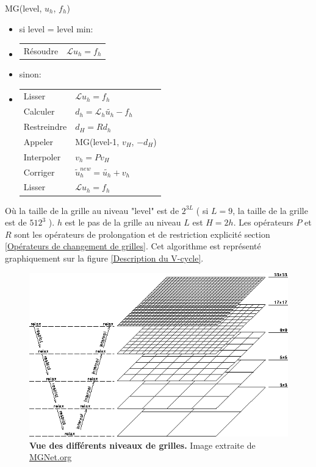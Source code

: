 MG(level, $u_h$, $f_h$)
\begin{itemize}	
\item 	si level = level min:
\item[]	\begin{tabular}{ll}
		Résoudre & $\mathcal{L} u_h = f_h $
		\end{tabular}
\item 	sinon:
\item[]	\begin{tabular}{ll}
		Lisser 		& 	$ \mathcal{L} u_h = f_h $\\
		Calculer	&	$ d_h = \mathcal{L}_h \tilde{u_h} - f_h $\\
		Restreindre	&	$ d_H = Rd_h$\\
		Appeler 	&	MG(level-1, $v_H$, $-d_H$) \\
		Interpoler	&	$ v_h = Pv_H$\\
		Corriger	&	$ \tilde{u}_h^{new} = \tilde{u_h} + v_h$\\
		Lisser		&	$ \mathcal{L} u_h = f_h $
		\end{tabular} 
\end{itemize}

Où la taille de la grille au niveau "level" est de $2^{3L}$ ( si $L=9$, la taille de la grille est de $512^3$ ). $h$ est le pas de la grille au niveau $L$ est $H = 2h$. 
Les opérateurs $P$ et $R$ sont les opérateurs de prolongation et de restriction explicité section \ref{Opérateurs de changement de grilles}.
Cet algorithme est représenté graphiquement sur la figure \ref{Description du V-cycle}.

\begin{figure}[htbp]
\begin{center}
\includegraphics[scale=0.35]{img/02/multigrid.png}
\caption{\textbf{Vue des différents niveaux de grilles.} Image extraite de \href{http://MGNet.org}{MGNet.org} }
\label{Vue des différents niveaux de grilles}
\end{center}
\end{figure}	

